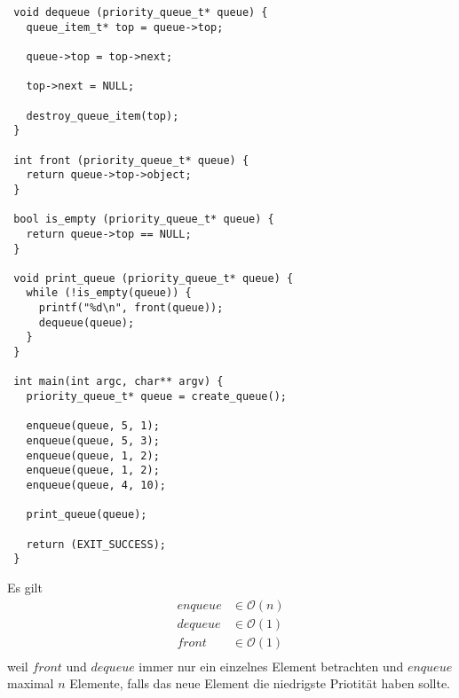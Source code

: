 \documentclass[a4paper,10pt]{article}
\begin{document}
\begin{lstlisting}
 void dequeue (priority_queue_t* queue) {
   queue_item_t* top = queue->top;
   
   queue->top = top->next;
   
   top->next = NULL;
   
   destroy_queue_item(top);
 }

 int front (priority_queue_t* queue) {
   return queue->top->object;
 }

 bool is_empty (priority_queue_t* queue) {
   return queue->top == NULL;
 }

 void print_queue (priority_queue_t* queue) {
   while (!is_empty(queue)) {
     printf("%d\n", front(queue));
     dequeue(queue);
   }
 }

 int main(int argc, char** argv) {
   priority_queue_t* queue = create_queue();
   
   enqueue(queue, 5, 1);
   enqueue(queue, 5, 3);
   enqueue(queue, 1, 2);
   enqueue(queue, 1, 2);
   enqueue(queue, 4, 10);
   
   print_queue(queue);

   return (EXIT_SUCCESS);
 }
\end{lstlisting}
Es gilt
\begin{align*}
 enqueue & \in \mathcal{O}(n)\\
 dequeue & \in \mathcal{O}(1)\\
 front & \in \mathcal{O}(1)\\
\end{align*}
weil $front$ und $dequeue$ immer nur ein einzelnes Element betrachten und $enqueue$ maximal $n$ Elemente, falls das neue Element die niedrigste Priotität haben sollte.
\end{document}
